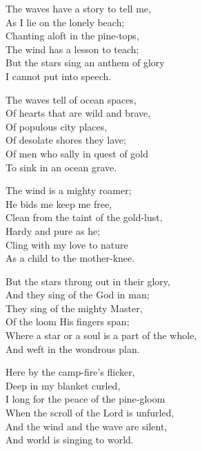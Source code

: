 
\begin{poemblock}
The waves have a story to tell me,\\
\idt As I lie on the lonely beach;\\
Chanting aloft in the pine-tops,\\
\idt The wind has a lesson to teach;\\
But the stars sing an anthem of glory\\
\idt I cannot put into speech.

The waves tell of ocean spaces,\\
\idt Of hearts that are wild and brave,\\
Of populous city places,\\
\idt Of desolate shores they lave;\\
Of men who sally in quest of gold\\
\idt To sink in an ocean grave.

The wind is a mighty roamer;\\
\idt He bids me keep me free,\\
Clean from the taint of the gold-lust,\\
\idt Hardy and pure as he;\\
Cling with my love to nature\\
\idt As a child to the mother-knee.

But the stars throng out in their glory,\\
\idt And they sing of the God in man;\\
They sing of the mighty Master,\\
\idt Of the loom His fingers span;\\
Where a star or a soul is a part of the whole,\\
\idt And weft in the wondrous plan.

Here by the camp-fire's flicker,\\
\idt Deep in my blanket curled,\\
I long for the peace of the pine-gloom\\
\idt When the scroll of the Lord is unfurled,\\
And the wind and the wave are silent,\\
\idt And world is singing to world.

\end{poemblock}
